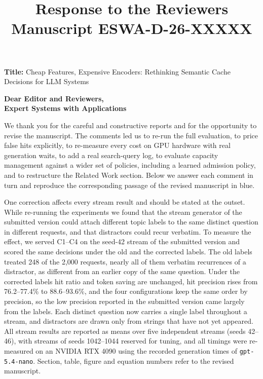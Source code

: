 \documentclass[11pt]{article}
\title{Response to the Reviewers \\ Manuscript ESWA-D-26-XXXXX}
\author{}
\date{}
\begin{document}
\maketitle

\noindent\textbf{Title:} Cheap Features, Expensive Encoders: Rethinking Semantic Cache Decisions for LLM Systems

\bigskip
\noindent \textbf{Dear Editor and Reviewers,\\
Expert Systems with Applications}

We thank you for the careful and constructive reports and for the opportunity to revise the manuscript. The comments led us to re-run the full evaluation, to price false hits explicitly, to re-measure every cost on GPU hardware with real generation waits, to add a real search-query log, to evaluate capacity management against a wider set of policies, including a learned admission policy, and to restructure the Related Work section. Below we answer each comment in turn and reproduce the corresponding passage of the revised manuscript in blue.

One correction affects every stream result and should be stated at the outset. While re-running the experiments we found that the stream generator of the submitted version could attach different topic labels to the same distinct question in different requests, and that distractors could recur verbatim. To measure the effect, we served C1--C4 on the seed-42 stream of the submitted version and scored the same decisions under the old and the corrected labels. The old labels treated 248 of the 2,000 requests, nearly all of them verbatim recurrences of a distractor, as different from an earlier copy of the same question. Under the corrected labels hit ratio and token saving are unchanged, hit precision rises from 76.2--77.4\% to 88.6--93.6\%, and the four configurations keep the same order by precision, so the low precision reported in the submitted version came largely from the labels. Each distinct question now carries a single label throughout a stream, and distractors are drawn only from strings that have not yet appeared. All stream results are reported as means over five independent streams (seeds 42--46), with streams of seeds 1042--1044 reserved for tuning, and all timings were re-measured on an NVIDIA RTX 4090 using the recorded generation times of \texttt{gpt-5.4-nano}. Section, table, figure and equation numbers refer to the revised manuscript.

\end{document}
